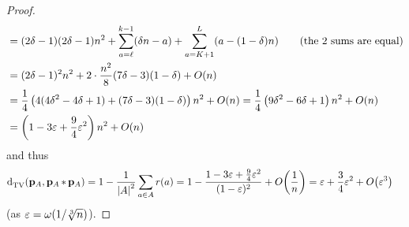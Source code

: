 \begin{proof}
\begin{align*}
     &= (2\delta-1)(2\delta-1)n^2 + \sum_{a=\ell}^{k-1} (\delta n-a) + \sum_{a=K+1}^{L} (a-(1-\delta) n)  \tag{the 2 sums are equal}\\
     &= (2\delta-1)^2n^2 + 2\cdot\frac{n^2}{8}(7\delta-3)(1-\delta) + \bigO{n} \\
    &= \frac{1}{4}\left( 4(4\delta^2-4\delta+1)+(7\delta-3)(1-\delta) \right)n^2 + \bigO{n} = \frac{1}{4}\left( 9\delta^2-6\delta+1\right)n^2 + \bigO{n} \\
    &= \left(1-3\eps+\frac{9}{4}\eps^2\right)n^2 + \bigO{n}
  \end{align*}
  and thus
  \begin{align*}
    \totalvardist{ \D_A }{ \D_A\convolution \D_A } = 1-\frac{1}{\abs{A}^2}\sum_{a\in A}r(a) &= 1- \frac{1-3\eps+\frac{9}{4}\eps^2}{(1-\eps)^2} + \bigO{\frac{1}{n}} = \eps+\frac{3}{4}\eps^2 + \bigO{\eps^3}
  \end{align*}
  (as $\varepsilon = \omega(1/\sqrt[3]{n})$).
\end{proof}
